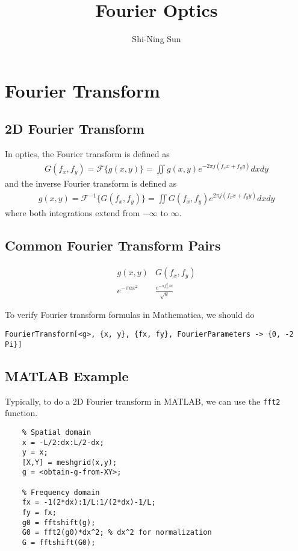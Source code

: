 \documentclass{revtex4-2}
\begin{document}
\title{Fourier Optics}
\author{Shi-Ning Sun}
\maketitle

\section{Fourier Transform}

\subsection{2D Fourier Transform}

In optics, the Fourier transform is defined as
\begin{align}
    G(f_x, f_y) = \mathcal{F}\{g(x, y)\} = \iint g(x, y) e^{-2\pi j(f_x x + f_y y)} dx dy
\end{align}
and the inverse Fourier transform is defined as
\begin{align}
    g(x, y) = \mathcal{F}^{-1}\{G(f_x, f_y)\} = \iint G(f_x, f_y) e^{2\pi j(f_x x + f_y y)} dx dy
\end{align} 
where both integrations extend from $-\infty$ to $\infty$.

\subsection{Common Fourier Transform Pairs}

$$
\begin{array}{c|c}
    g(x, y) & G(f_x, f_y) \\
    \hline
    e^{-\pi a x^2} & \frac{e^{-\pi f_x^2 / a}}{\sqrt{a}}
\end{array}
$$

To verify Fourier transform formulas in Mathematica, we should do

\begin{verbatim}
FourierTransform[<g>, {x, y}, {fx, fy}, FourierParameters -> {0, -2 Pi}]
\end{verbatim}

\subsection{MATLAB Example}

Typically, to do a 2D Fourier transform in MATLAB, we can use the {\tt fft2} function.
\begin{verbatim}
    % Spatial domain
    x = -L/2:dx:L/2-dx;
    y = x;
    [X,Y] = meshgrid(x,y);
    g = <obtain-g-from-XY>;

    % Frequency domain
    fx = -1(2*dx):1/L:1/(2*dx)-1/L;
    fy = fx;
    g0 = fftshift(g);
    G0 = fft2(g0)*dx^2; % dx^2 for normalization
    G = fftshift(G0);
\end{verbatim}
\end{document}

